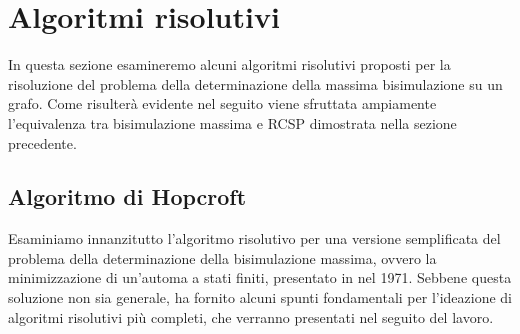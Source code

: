 \section{Algoritmi risolutivi}
In questa sezione esamineremo alcuni algoritmi risolutivi proposti per la risoluzione del problema della determinazione della massima bisimulazione su un grafo. Come risulterà evidente nel seguito viene sfruttata ampiamente l'equivalenza tra bisimulazione massima e RCSP dimostrata nella sezione precedente.

\subsection{Algoritmo di Hopcroft}
Esaminiamo innanzitutto l'algoritmo risolutivo per una versione semplificata del problema della determinazione della bisimulazione massima, ovvero la minimizzazione di un'automa a stati finiti, presentato in \cite{hopcroft} nel 1971. Sebbene questa soluzione non sia generale, ha fornito alcuni spunti fondamentali per l'ideazione di algoritmi risolutivi più completi, che verranno presentati nel seguito del lavoro.

